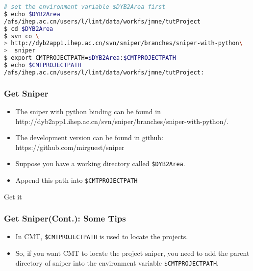 \newsavebox{\getsniper}
\begin{lrbox}{\getsniper}
\begin{lstlisting}[language=bash]
# set the environment variable $DYB2Area first
$ echo $DYB2Area
/afs/ihep.ac.cn/users/l/lint/data/workfs/jmne/tutProject
$ cd $DYB2Area
$ svn co \
> http://dyb2app1.ihep.ac.cn/svn/sniper/branches/sniper-with-python\
>  sniper
$ export CMTPROJECTPATH=$DYB2Area:$CMTPROJECTPATH
$ echo $CMTPROJECTPATH
/afs/ihep.ac.cn/users/l/lint/data/workfs/jmne/tutProject:
\end{lstlisting}
\end{lrbox}

\begin{frame}
    \frametitle{Get Sniper}
    \begin{itemize}
        \item The sniper with python binding can be found
                in http://dyb2app1.ihep.ac.cn/svn/sniper/branches/sniper-with-python/.
        \item The development version can be found in github:
                https://github.com/mirguest/sniper
        \item Suppose you have a working directory 
                called {\tt \$DYB2Area}.
        \item Append this path into {\tt \$CMTPROJECTPATH}
    \end{itemize}
    \begin{block}{Get it}
        \par\usebox{\getsniper}
    \end{block}
\end{frame}

\begin{frame}
    \frametitle{Get Sniper(Cont.): Some Tips}
    \begin{itemize}
        \item In CMT, {\tt \$CMTPROJECTPATH}
                is used to locate the projects.
        \item So, if you want CMT to locate the 
                project sniper, you need to add the 
                parent directory of sniper into 
                the environment variable {\tt \$CMTPROJECTPATH}.

    \end{itemize}
\end{frame}
